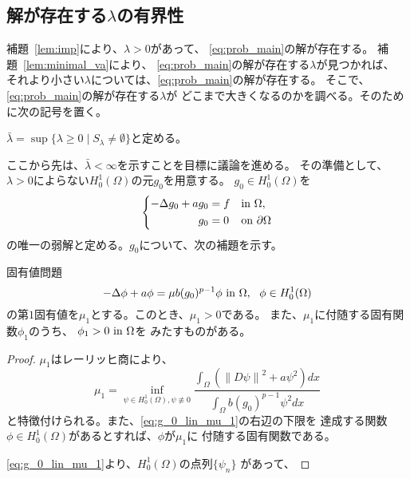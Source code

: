 \subsection{解が存在する$\lambda$の有界性}

補題~\ref{lem:imp}により、$\lambda > 0$があって、
\ref{eq:prob_main}の解が存在する。
補題~\ref{lem:minimal_va}により、
\ref{eq:prob_main}の解が存在する$\lambda$が見つかれば、
それより小さい$\lambda$については、\ref{eq:prob_main}の解が存在する。
そこで、\ref{eq:prob_main}の解が存在する$\lambda$が
どこまで大きくなるのかを調べる。そのために次の記号を置く。

\begin{nota}
 $\bar{\lambda} = \sup \{ \lambda \geq 0 \mid S_\lambda \neq \emptyset
 \}$と定める。
\end{nota}

ここから先は、$\bar{\lambda} < \infty$を示すことを目標に議論を進める。
その準備として、$\lambda > 0$によらない$H_0^1(\Omega)$の元$g_0$を用意する。
$g_0 \in H_0^1(\Omega)$を
\begin{align}
 \left\{
 \begin{aligned}
    -\Delta g_0 + a g_0 
  &= f  & &\text{in}~ \Omega,  \\
  g_0 &= 0 & &\text{on}~ \partial\Omega
 \end{aligned}
 \right. \label{eq:g_0}
\end{align}
の唯一の弱解と定める。$g_0$について、次の補題を示す。

\begin{lem}
 固有値問題
 \[
  -\Delta \phi + a \phi = \mu b (g_0)^{p-1}\phi ~\text{in}~ \Omega, \ \
 \phi \in H_0^1(\Omega)
 \]
 の第$1$固有値を$\mu_1$とする。このとき、$\mu_1 > 0$である。
 また、$\mu_1$に付随する固有関数$\phi_1$のうち、
 $\phi_1 > 0 ~\text{in}~ \Omega$を
 みたすものがある。
\end{lem}

\begin{proof}
 $\mu_1$はレーリッヒ商により、
 \begin{equation}
  \mu_1 = \inf_{\psi \in H_0^1(\Omega), \psi \not\equiv 0}
   \frac{\displaystyle \int_\Omega \left( \left\| D \psi \right\|^2 + a \psi^2
                     \right) dx}{\displaystyle \int_\Omega b (g_0)^{p-1} \psi^2 dx}
   \label{eq:g_0_lin_mu_1}
 \end{equation}
 と特徴付けられる。また、\eqref{eq:g_0_lin_mu_1}の右辺の下限を
 達成する関数$\phi \in H_0^1(\Omega)$があるとすれば、$\phi$が$\mu_1$に
 付随する固有関数である。

 \eqref{eq:g_0_lin_mu_1}より、$H_0^1(\Omega)$の点列$\{ \psi_n \}$
 があって、
 \qedhere
\end{proof}